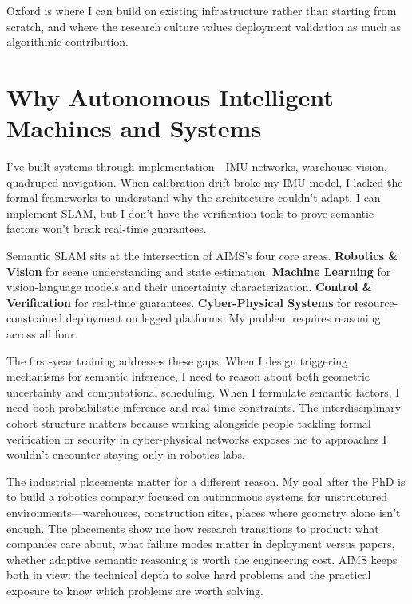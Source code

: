 \documentclass[11pt,a4paper]{article}
\begin{document}
Oxford is where I can build on existing infrastructure rather than starting from scratch, and where the research culture values deployment validation as much as algorithmic contribution.

\section*{Why Autonomous Intelligent Machines and Systems}

I've built systems through implementation—IMU networks, warehouse vision, quadruped navigation. When calibration drift broke my IMU model, I lacked the formal frameworks to understand why the architecture couldn't adapt. I can implement SLAM, but I don't have the verification tools to prove semantic factors won't break real-time guarantees.

Semantic SLAM sits at the intersection of AIMS's four core areas. \textbf{Robotics \& Vision} for scene understanding and state estimation. \textbf{Machine Learning} for vision-language models and their uncertainty characterization. \textbf{Control \& Verification} for real-time guarantees. \textbf{Cyber-Physical Systems} for resource-constrained deployment on legged platforms. My problem requires reasoning across all four.

The first-year training addresses these gaps. When I design triggering mechanisms for semantic inference, I need to reason about both geometric uncertainty and computational scheduling. When I formulate semantic factors, I need both probabilistic inference and real-time constraints. The interdisciplinary cohort structure matters because working alongside people tackling formal verification or security in cyber-physical networks exposes me to approaches I wouldn't encounter staying only in robotics labs.

The industrial placements matter for a different reason. My goal after the PhD is to build a robotics company focused on autonomous systems for unstructured environments—warehouses, construction sites, places where geometry alone isn't enough. The placements show me how research transitions to product: what companies care about, what failure modes matter in deployment versus papers, whether adaptive semantic reasoning is worth the engineering cost. AIMS keeps both in view: the technical depth to solve hard problems and the practical exposure to know which problems are worth solving.



\end{document}

